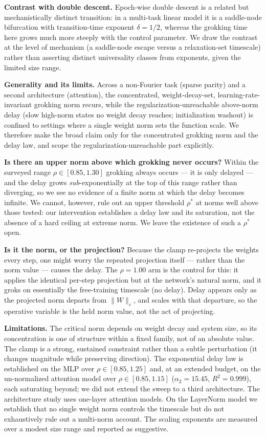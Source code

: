 \documentclass[10pt,twocolumn]{article}
\newcommand{\Wc}{\|W\|_{c}}
\begin{document}
\textbf{Contrast with double descent.} Epoch-wise double descent is a related but mechanistically distinct
transition: in a multi-task linear model it is a saddle-node bifurcation with transition-time exponent
$\delta=1/2$, whereas the grokking time here grows much more steeply with the control parameter. We draw the
contrast at the level of mechanism (a saddle-node escape versus a relaxation-set timescale) rather than
asserting distinct universality classes from exponents, given the limited size range.

\textbf{Generality and its limits.} Across a non-Fourier task (sparse parity) and a second architecture
(attention), the concentrated, weight-decay-set, learning-rate-invariant grokking norm recurs, while the
regularization-unreachable above-norm delay (slow high-norm states no weight decay reaches; initialization
washout) is confined to settings where a single weight norm sets the function scale. We therefore make the
broad claim only for the concentrated grokking norm and the delay law, and scope the
regularization-unreachable part explicitly.

\textbf{Is there an upper norm above which grokking never occurs?} Within the surveyed range
$\rho\in[0.85,1.30]$ grokking always occurs --- it is only delayed --- and the delay grows
\emph{sub}-exponentially at the top of this range rather than diverging, so we see no evidence of a finite
norm at which the delay becomes infinite. We cannot, however, rule out an upper threshold $\rho^{*}$ at
norms well above those tested: our intervention establishes a delay law and its saturation, not the absence
of a hard ceiling at extreme norm. We leave the existence of such a $\rho^{*}$ open.

\textbf{Is it the norm, or the projection?} Because the clamp re-projects the weights every step, one might
worry the repeated projection itself --- rather than the norm value --- causes the delay. The $\rho=1.00$
arm is the control for this: it applies the identical per-step projection but at the network's natural norm,
and it groks on essentially the free-training timescale (no delay). Delay appears only as the projected norm
departs from $\Wc$, and scales with that departure, so the operative variable is the held norm value, not
the act of projecting.

\textbf{Limitations.} The critical norm depends on weight decay and system size, so its concentration is one
of structure within a fixed family, not of an absolute value. The clamp is a strong, sustained constraint
rather than a subtle perturbation (it changes magnitude while preserving direction). The exponential delay
law is established on the MLP over $\rho\in[0.85,1.25]$ and, at an extended budget, on the un-normalized
attention model over $\rho\in[0.85,1.15]$ ($\alpha_2=15.45$, $R^2=0.999$), each saturating beyond; we did
not extend the sweep to a third architecture. The architecture study uses
one-layer attention models. On the LayerNorm model we establish that no single weight norm controls the
timescale but do not exhaustively rule out a multi-norm account. The scaling exponents are measured over a
modest size range and reported as suggestive.
\end{document}
